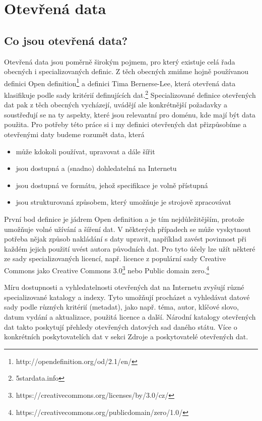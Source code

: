 \chapter{Otevřená data}
\section{Co jsou otevřená data?}
Otevřená data jsou poměrně širokým pojmem, pro který existuje celá řada obecných i specializovaných definic. Z těch obecných zmiňme hojně používanou definici Open definition\footnote{http://opendefinition.org/od/2.1/en/} a definici Tima Bernerse-Lee, která otevřená data klasifikuje podle sady kritérií definujících  dat.\footnote{5stardata.info} Specializované definice otevřených dat pak z těch obecných vycházejí, uvádějí ale konkrétnější požadavky a soustřeďují se na ty aspekty, které jsou relevantní pro doménu, kde mají být data použita. Pro potřeby této práce si i my definici otevřených dat přizpůsobíme a otevřenými daty budeme rozumět data, která
\begin{itemize}
	\item může kdokoli používat, upravovat a dále šířit
	\item jsou dostupná a (snadno) dohledatelná na Internetu
	\item jsou dostupná ve formátu, jehož specifikace je volně přístupná
	\item jsou strukturovaná způsobem, který umožňuje je strojově zpracovávat
\end{itemize}

První bod definice je jádrem Open definition a je tím nejdůležitějším, protože umožňuje volné užívání a šíření dat. V některých případech se může vyskytnout potřeba nějak způsob nakládání s daty upravit, například zavést povinnost při každém jejich použití uvést autora původních dat. Pro tyto účely lze užít některé ze sady specializovaných licencí, např. licence z populární sady Creative Commons jako Creative Commons 3.0\footnote{https://creativecommons.org/licenses/by/3.0/cz/} nebo Public domain zero.\footnote{https://creativecommons.org/publicdomain/zero/1.0/}

Míru dostupnosti a vyhledatelnosti otevřených dat na Internetu zvyšují různé specializované katalogy a indexy. Tyto umožňují procházet a vyhledávat datové sady podle různých kritérií (metadat), jako např. téma, autor, klíčové slovo, datum vydání a aktualizace, použitá licence a další. Národní katalogy otevřených dat takto poskytují přehledy otevřených datových sad daného státu. Více o konkrétních poskytovatelích dat v sekci Zdroje a poskytovatelé otevřených dat.

